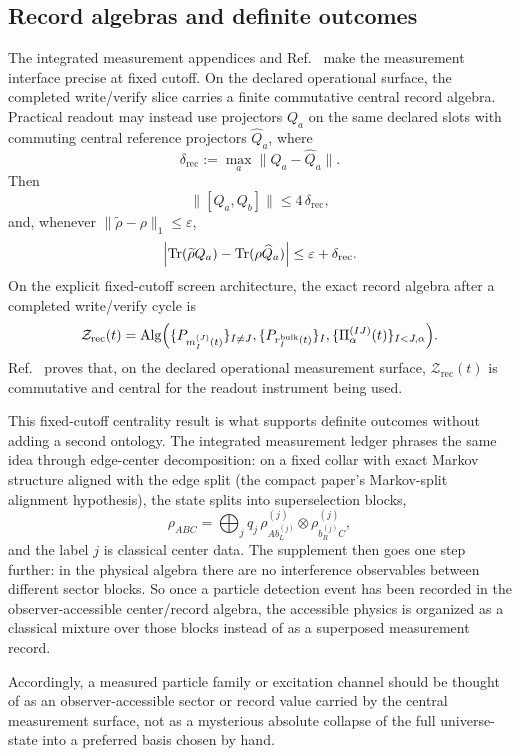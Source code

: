 \documentclass[11pt]{article}
\begin{document}
\subsection{Record algebras and definite outcomes}

The integrated measurement appendices and Ref.~\cite{ophmicrophysics} make the measurement
interface precise at fixed cutoff. On the declared operational surface, the completed
write/verify slice carries a finite commutative central record algebra. Practical readout may
instead use projectors \(Q_a\) on the same declared slots with commuting central reference
projectors \(\widehat Q_a\), where
\[
\delta_{\mathrm{rec}}:=\max_a \|Q_a-\widehat Q_a\|.
\]
Then
\[
\|[Q_a,Q_b]\|\le 4\,\delta_{\mathrm{rec}},
\]
and, whenever \(\|\widetilde\rho-\rho\|_1\le\varepsilon\),
\[
\Bigl|
\operatorname{Tr}(\widetilde\rho Q_a)-\operatorname{Tr}(\rho \widehat Q_a)
\Bigr|
\le
\varepsilon+\delta_{\mathrm{rec}}.
\]
On the explicit fixed-cutoff screen architecture, the exact record algebra after a completed
write/verify cycle is
\[
\mathcal Z_{\mathrm{rec}}(t)
=
\mathrm{Alg}\Bigl(
\{P_{m_I^{(J)}(t)}\}_{I\neq J},
\{P_{r_I^{\mathrm{bulk}}(t)}\}_I,
\{\Pi_\alpha^{(IJ)}(t)\}_{I<J,\alpha}
\Bigr).
\]
Ref.~\cite{ophmicrophysics} proves that, on the declared operational measurement surface,
\(\mathcal Z_{\mathrm{rec}}(t)\) is commutative and central for the readout instrument being
used.

This fixed-cutoff centrality result is what supports definite outcomes without adding a second
ontology. The integrated measurement ledger phrases the same idea through edge-center
decomposition: on a fixed collar with exact Markov structure aligned with the edge split (the
compact paper's Markov-split alignment hypothesis), the state splits into
superselection blocks,
\[
\rho_{ABC}
=
\bigoplus_j
q_j\,
\rho^{(j)}_{A b_L^{(j)}}\otimes \rho^{(j)}_{b_R^{(j)} C},
\]
and the label \(j\) is classical center data. The supplement then goes one step further: in the
physical algebra there are no interference observables between different sector blocks. So once a
particle detection event has been recorded in the observer-accessible center/record algebra, the
accessible physics is organized as a classical mixture over those blocks instead of as a
superposed measurement record.

Accordingly, a measured particle family or excitation channel should be
thought of as an observer-accessible sector or record value carried by the central measurement
surface, not as a mysterious absolute collapse of the full universe-state into a preferred basis
chosen by hand.
\end{document}
